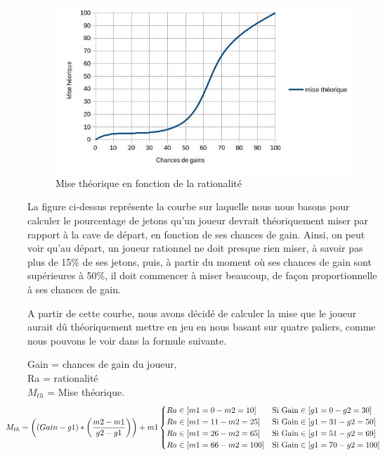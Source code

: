 \documentclass{report}
\begin{document}
\begin{figure}[H]
	\begin{center}
		\includegraphics[scale=0.5]{./imagesRapport/courbeRationaliteMiseTheorique.jpg}
	\end{center}
	\caption[Mise théorique en fonction de la rationalité]{Mise théorique en fonction de la rationalité}
\end{figure}

La figure ci-dessus représente la courbe sur laquelle nous nous basons pour calculer le pourcentage de jetons qu'un joueur devrait théoriquement miser par rapport à la cave de départ, en fonction de ses chances de gain. Ainsi, on peut voir qu'au départ, un joueur rationnel ne doit presque rien miser, à savoir pas plus de 15\% de ses jetons, puis, à partir du moment où ses chances de gain sont supérieures à 50\%, il doit commencer à miser beaucoup, de façon proportionnelle à ses chances de gain.

A partir de cette courbe, nous avons décidé de calculer la mise que le joueur aurait dû théoriquement mettre en jeu en nous basant sur quatre paliers, comme nous pouvons le voir dans la formule suivante. \par

\small{
 	Gain = chances de gain du joueur,\\
Ra = rationalité\\
$M_{th}$ = Mise théorique.\\

\begin{align*}
	\hspace{-1cm}M_{th} = \left((Gain - g1) * \left(\frac{m2-m1}{g2-g1}\right)\right)+m1
	\begin{cases}
		Ra \in [m1=0 - m2=10] &\text{Si Gain} \in [g1=0 - g2=30]\\
		Ra \in [m1=11 - m2=25] &\text{Si Gain} \in [g1=31 - g2=50]\\
		Ra \in [m1=26 - m2=65] &\text{Si Gain} \in [g1=51 - g2=69]\\
		Ra \in [m1=66 - m2=100] &\text{Si Gain} \in [g1=70 - g2=100]\\
	\end{cases}
\end{align*}
}
\end{document}
